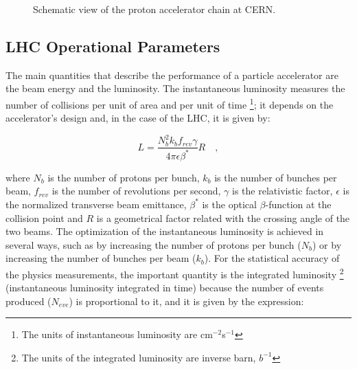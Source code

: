 \begin{figure}[ht]
\begin{center}
\caption{Schematic view of the proton accelerator chain at CERN.}\label{figchp2:LHCaccelerationchain}
\end{center}
\end{figure}



\subsection{LHC Operational Parameters}
\label{sec:LHCparameters}

The main quantities that describe the performance of a particle accelerator are the beam energy and 
the luminosity. The instantaneous luminosity measures the number of collisions per unit of area 
and per unit of time \footnote{The units of instantaneous luminosity are 
cm$^{-2}$s$^{-1}$}; it depends on the accelerator's design and, in the 
case of the LHC, it is given by:

\begin{equation}
 L = \frac{N_{b}^{2}k_{b}f_{rev}\gamma}{4 \pi \epsilon \beta^{*}}R\quad,
\end{equation}

where $N_{b}$ is the number of protons per bunch, $k_{b}$ is the number of bunches per beam, $f_{rev}$
is the number of revolutions per second, $\gamma$ is the relativistic factor, $\epsilon$ is the 
normalized transverse beam emittance, $\beta^{*}$ is the optical $\beta$-function at the
collision point and $R$ is a
geometrical factor related with the crossing angle of the two beams. The optimization of 
the instantaneous luminosity is achieved in several ways, such as by increasing the number
of protons per bunch ($N_{b}$) or by increasing the number of bunches per beam ($k_{b}$). For the statistical accuracy 
of the physics measurements, the important quantity is the integrated luminosity \footnote{The units of the 
integrated luminosity are inverse barn, $b^{-1}$} (instantaneous luminosity integrated in time) because the number of events 
produced ($N_{eve}$) is proportional to it, and it is given by the expression:

